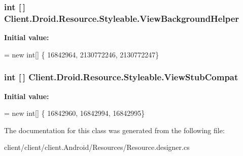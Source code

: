 \subsubsection[{View\+Background\+Helper}]{\setlength{\rightskip}{0pt plus 5cm}int \mbox{[}$\,$\mbox{]} Client.\+Droid.\+Resource.\+Styleable.\+View\+Background\+Helper\hspace{0.3cm}{\ttfamily [static]}}\label{classClient_1_1Droid_1_1Resource_1_1Styleable_a9f5a8ce2f84307f25fae90ff1b8aa4a7}
{\bfseries Initial value\+:}
\begin{DoxyCode}
= \textcolor{keyword}{new} \textcolor{keywordtype}{int}[]
            \{
                    16842964,
                    2130772246,
                    2130772247\}
\end{DoxyCode}
\hypertarget{classClient_1_1Droid_1_1Resource_1_1Styleable_a4b38882ec1634005ad7f896b3c53f4b5}{}
\subsubsection[{View\+Stub\+Compat}]{\setlength{\rightskip}{0pt plus 5cm}int \mbox{[}$\,$\mbox{]} Client.\+Droid.\+Resource.\+Styleable.\+View\+Stub\+Compat\hspace{0.3cm}{\ttfamily [static]}}\label{classClient_1_1Droid_1_1Resource_1_1Styleable_a4b38882ec1634005ad7f896b3c53f4b5}
{\bfseries Initial value\+:}
\begin{DoxyCode}
= \textcolor{keyword}{new} \textcolor{keywordtype}{int}[]
            \{
                    16842960,
                    16842994,
                    16842995\}
\end{DoxyCode}


The documentation for this class was generated from the following file\+:\begin{DoxyCompactItemize}
\item 
client/client/client.\+Android/\+Resources/Resource.\+designer.\+cs\end{DoxyCompactItemize}
